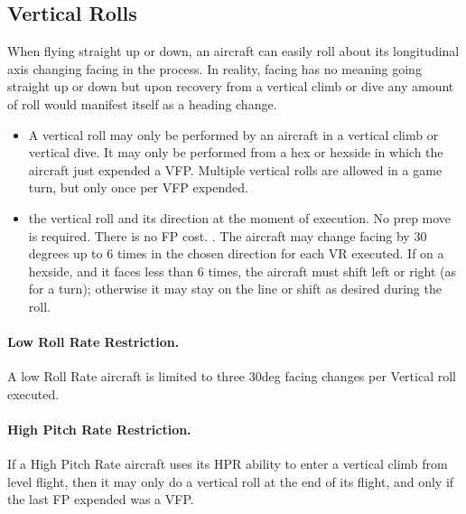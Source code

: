 
\subsection{Vertical Rolls}
\label{rule:vertical-rolls}

When flying straight up or down, an aircraft can easily roll about its longitudinal axis changing facing in the process. In reality, facing has no meaning going straight up or down but upon recovery from a vertical climb or dive any amount of roll would manifest itself as a heading change.

\begin{itemize}

    \item{} A vertical roll may only be performed by an aircraft in a vertical climb or vertical dive. It may only be performed from a hex or hexside in which the aircraft just expended a VFP. Multiple vertical rolls are allowed in a game turn, but only once per VFP expended.

    \item{}  the vertical roll and its direction at the moment of execution. No prep move is required. There is no FP cost. . The aircraft may change facing  by 30 degrees up to 6 times in the chosen direction for each VR executed. If on a hexside, and it faces less than 6 times, the aircraft must shift left or right (as for a turn); otherwise it may stay on the line or shift as desired during the roll.  

\end{itemize}

\paragraph{Low Roll Rate Restriction.} A low Roll Rate aircraft is limited to three 30{deg} facing changes per Vertical roll executed.

\paragraph{High Pitch Rate Restriction.} If a High Pitch Rate aircraft uses its HPR ability to enter a vertical climb from level flight, then it may only do a vertical roll at the end of its flight, and only if the last FP expended was a VFP.

